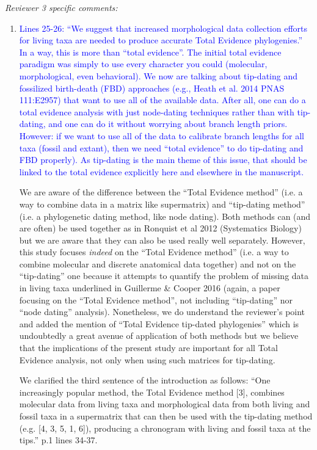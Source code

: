 \documentclass[12pt,letterpaper]{article}
\renewcommand{\subsection}[1]{%
\bigskip
\begin{center}
\begin{large}
\normalfont\itshape #1
\end{large}
\end{center}}
\begin{document}
\subsection{Reviewer 3 specific comments:}
\begin{enumerate}
\item{\textcolor{blue}{Lines 25-26: ``We suggest that increased morphological data collection efforts for living taxa are needed to produce accurate Total Evidence phylogenies.''
In a way, this is more than ``total evidence''.
The initial total evidence paradigm was simply to use every character you could (molecular, morphological, even behavioral).
We now are talking about tip-dating and fossilized birth-death (FBD) approaches (e.g., Heath et al. 2014 PNAS 111:E2957) that want to use all of the available data.
After all, one can do a total evidence analysis with just node-dating techniques rather than with tip-dating, and one can do it without worrying about branch length priors.
However: if we want to use all of the data to calibrate branch lengths for all taxa (fossil and extant), then we need ``total evidence'' to do tip-dating and FBD properly).
As tip-dating is the main theme of this issue, that should be linked to the total evidence explicitly here and elsewhere in the manuscript.}}

We are aware of the difference between the ``Total Evidence method'' (i.e. a way to combine data in a matrix like supermatrix) and ``tip-dating method'' (i.e. a phylogenetic dating method, like node dating).
Both methods can (and are often) be used together as in Ronquist et al 2012 (Systematics Biology) but we are aware that they can also be used really well separately.
However, this study focuses \textit{indeed} on the ``Total Evidence method'' (i.e. a way to combine molecular and discrete anatomical data together) and not on the ``tip-dating'' one because it attempts to quantify the problem of missing data in living taxa underlined in Guillerme \& Cooper 2016 (again, a paper focusing on the ``Total Evidence method'', not including ``tip-dating'' nor ``node dating'' analysis).
Nonetheless, we do understand the reviewer's point and added the mention of ``Total Evidence tip-dated phylogenies'' which is undoubtedly a great avenue of application of both methods but we believe that the implications of the present study are important for all Total Evidence analysis, not only when using such matrices for tip-dating.

We clarified the third sentence of the introduction as follows:
``One increasingly popular method, the Total Evidence method [3], combines molecular data from living taxa and morphological data from both living and fossil taxa in a supermatrix that can then be used with the tip-dating method (e.g. [4, 3, 5, 1, 6]), producing a chronogram with living and fossil taxa at the tips.'' p.1 lines 34-37.


\end{enumerate}
\end{document}
